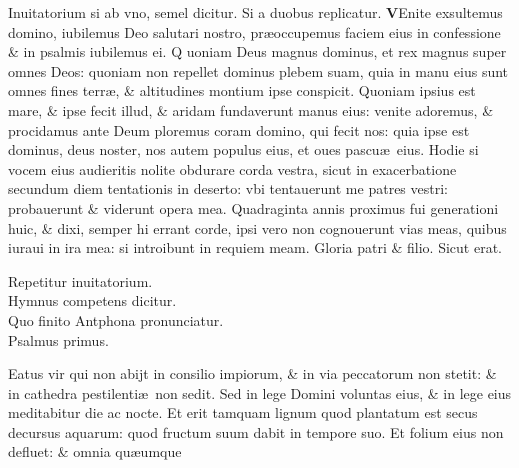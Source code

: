 \documentclass[a5paper,10pt]{book}
\def\ae{æ}
\begin{document}
\begin{multicols*}{2}
\newline
\color{red} Inuitatorium si ab vno, semel dicitur. Si a duobus replicatur. \color{black}
\vspace{-.25em}
\lettrine[lines=2]{\bfseries \color{red} V}{}Enite exsultemus domino, iubilemus Deo salutari nostro, pr\ae occupemus faciem eius in confessione \& in psalmis iubilemus ei.
\newline
\color{red} Q\color{black}
uoniam Deus magnus dominus, et rex magnus super omnes %
Deos: quoniam non repellet dominus plebem suam, quia in manu eius sunt omnes fines terr\ae , \& altitudines montium ipse conspicit.
\newline
\color{red} Q\color{black}uoniam ipsius est mare, \& ipse fecit illud, \& aridam fundaverunt manus eius: venite adoremus, \& procidamus ante Deum ploremus coram domino, qui fecit nos: quia ipse est dominus, deus noster, nos autem populus eius, et oues pascu\ae \ eius.
\newline
\color{red} H\color{black}odie si vocem eius audieritis nolite obdurare corda vestra, sicut in exacerbatione secundum diem tentationis in deserto: vbi tentauerunt me patres vestri: probauerunt \& viderunt opera mea.
\newline
\color{red} Q\color{black}uadraginta annis proximus fui generationi huic, \& dixi, semper hi errant corde, ipsi vero non cognouerunt vias meas, quibus iuraui in ira mea: si introibunt in requiem meam.
\newline
\color{red} G\color{black}loria patri \& filio. Sicut erat.
\vspace{-1em}
\begin{center} \color{red}
Repetitur inuitatorium.\\
Hymnus competens dicitur.\\
Quo finito Antphona pronunciatur.\\
Psalmus primus.
\end{center}
\vspace{-1em}
Eatus vir qui non abijt in consilio impiorum, \& in via peccatorum non stetit: \& in cathedra pestilenti\ae \ non sedit.
\newline \color{red} S\color{black}ed in lege Domini voluntas eius, \& in lege eius meditabitur die ac nocte.
\newline \color{red} E\color{black}t erit tamquam lignum quod plantatum est secus decursus aquarum: quod fructum suum dabit in tempore suo.
\newline \color{red} E\color{black}t folium eius non defluet: \& omnia qu\ae umque %

\end{multicols*}
\end{document}
